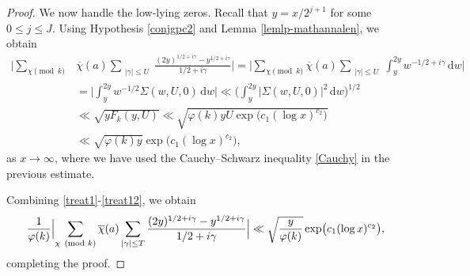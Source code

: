 \documentclass[pdflatex]{sn-jnl}%
\newcommand{\dx}{\mathrm{d}}
\theoremstyle{sltheorems}
\theoremstyle{plainrem}
\theoremstyle{definition}
\begin{document}
\begin{proof}
We now handle the low-lying zeros.
Recall that $y=x/2^{j+1}$ for some $0\le j\le J$. 
Using  Hypothesis \ref{conjgpc2} 
and Lemma \ref{lemlp-mathannalen},
we obtain
\begin{align}\label{treat12}
%
\Big \vert  \sum_{\chi \pmod{k}} & \overline{\chi}(a)
\sum_{\substack{ \vert \gamma \vert \le  U
 }} 
 \frac{(2y)^{1/2+ i\gamma}-y^{1/2+i\gamma}}{1/2 + i\gamma} \Big \vert   
 =
\Big \vert  \sum_{\chi \pmod{k}}\overline{\chi}(a) \sum_{\substack{ \vert \gamma \vert \le  U
 }} 
 \int_{y}^{2y} w^{-1/2+i\gamma}\, \dx w \Big \vert   
 \nonumber\\
& =
 \Big \vert \int_{y}^{2y} w^{-1/2} 
 \Sigma(w,U,0)
\, \dx w\Big \vert 
 \ll
 \Big( \int_{y}^{2y} 
 \vert\Sigma(w,U,0) \vert^2
\, \dx w\Big)^{1/2}
\nonumber\\&
\nonumber
\ll 
  \sqrt{y F_k(y, U)}
 \ll \sqrt{\varphi(k) y U 
 \exp\bigl(c_1(\log x)^{c_2}\bigr)}
 \\&
 \ll \sqrt{{\varphi(k)}y} \exp\bigl(c_1(\log x)^{c_2}\bigr) ,
\end{align}
as $x \to \infty$, where we have used the Cauchy--Schwarz inequality \eqref{Cauchy}
in the previous estimate.


Combining \eqref{treat1}-\eqref{treat12}, we obtain 
%
\begin{equation*}
\frac{1}{\varphi(k)} 
\Bigl\vert
\sum_{\chi \pmod{k}}\overline{\chi}(a) \sum_{\vert \gamma \vert \le  T}
\frac{(2y)^{1/2+ i\gamma}-y^{1/2+i\gamma}}{1/2 + i\gamma}
\Bigr\vert
\ll \sqrt{\frac{y}{{\varphi(k)}}} \exp\bigl(c_1(\log x)^{c_2}\bigr),
\end{equation*}
%  
completing the proof.
\end{proof}
\end{document}
